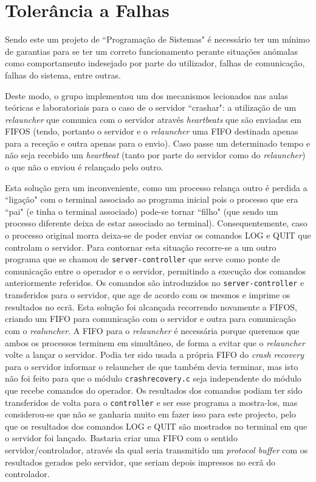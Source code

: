 \documentclass[a4paper]{article}
\begin{document}
	\section{Tolerância a Falhas}

	Sendo este um projeto de ``Programação de Sistemas" é necessário ter um mínimo de garantias para se ter um correto funcionamento perante situações anómalas como comportamento indesejado por parte do utilizador, falhas de comunicação, falhas do sistema, entre outras.  

	Deste modo, o grupo implementou um dos mecanismos lecionados nas aulas teóricas e laboratoriais para o caso de o servidor ``crashar": a utilização de um \textit{relauncher} que comunica com o servidor através \textit{heartbeats} que são enviadas em FIFOS (tendo, portanto o servidor e o \textit{relauncher} uma FIFO destinada apenas para a receção e outra apenas para o envio). Caso passe um determinado tempo e não seja recebido um \textit{heartbeat} (tanto por parte do servidor como do \textit{relauncher}) o que não o enviou é relançado pelo outro. 

	Esta solução gera um inconveniente, como um processo relança outro é perdida a ``ligação" com o terminal associado ao programa inicial pois o processo que era ``pai" (e tinha o terminal associado) pode-se tornar ``filho" (que sendo um processo diferente deixa de estar associado ao terminal). Consequentemente, caso o processo original morra deixa-se de poder enviar os comandos LOG e QUIT que controlam o servidor. Para contornar esta situação recorre-se a um outro programa que se chamou de \texttt{server-controller} que serve como ponte de comunicação entre o operador e o servidor, permitindo a execução dos comandos anteriormente referidos. Os comandos são introduzidos no \texttt{server-controller} e transferidos para o servidor, que age de acordo com os mesmos e imprime os resultados no ecrã. Esta solução foi alcançada recorrendo novamente a FIFOS, criando um FIFO para comunicação com o servidor e outra para comunicação com o \textit{realuncher}. A FIFO para o \textit{relauncher} é necessária porque queremos que ambos os processos terminem em simultâneo, de forma a evitar que o \textit{relauncher} volte a lançar o servidor. Podia ter sido usada a própria FIFO do \textit{crash recovery} para o servidor informar o relauncher de que também devia terminar, mas isto não foi feito para que o módulo \texttt{crashrecovery.c} seja independente do módulo que recebe comandos do operador. Os resultados dos comandos podiam ter sido transferidos de volta para o \texttt{controller} e ser esse programa a mostra-los, mas considerou-se que não se ganharia muito em fazer isso para este projecto, pelo que os resultados dos comandos LOG e QUIT são mostrados no terminal em que o servidor foi lançado. Bastaria criar uma FIFO com o sentido servidor/controlador, através da qual seria transmitido um \textit{protocol buffer} com os resultados gerados pelo servidor, que seriam depois impressos no ecrã do controlador.
\end{document}
